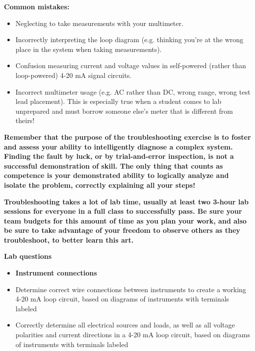 {\bf Common mistakes:}

\begin{itemize}
\item{} Neglecting to take measurements with your multimeter.
\item{} Incorrectly interpreting the loop diagram (e.g. thinking you're at the wrong place in the system when taking measurements).
\item{} Confusion measuring current and voltage values in self-powered (rather than loop-powered) 4-20 mA signal circuits.
\item{} Incorrect multimeter usage (e.g. AC rather than DC, wrong range, wrong test lead placement).  This is especially true when a student comes to lab unprepared and must borrow someone else's meter that is different from theirs!
\end{itemize}

\vskip 10pt

{\bf Remember that the purpose of the troubleshooting exercise is to foster and assess your ability to intelligently diagnose a complex system.  Finding the fault by luck, or by trial-and-error inspection, is not a successful demonstration of skill.  The only thing that counts as competence is your demonstrated ability to logically analyze and isolate the problem, correctly explaining all your steps!}

\vskip 10pt

{\bf Troubleshooting takes a lot of lab time, usually at least two 3-hour lab sessions for everyone in a full class to successfully pass.  Be sure your team budgets for this amount of time as you plan your work, and also be sure to take advantage of your freedom to observe others as they troubleshoot, to better learn this art.}



\vfil \eject

\noindent
{\bf Lab questions}

\vskip 5pt

\begin{itemize}
\item{} {\bf Instrument connections}
\item{} Determine correct wire connections between instruments to create a working 4-20 mA loop circuit, based on diagrams of instruments with terminals labeled
\item{} Correctly determine all electrical sources and loads, as well as all voltage polarities and current directions in a 4-20 mA loop circuit, based on diagrams of instruments with terminals labeled
\end{itemize}

